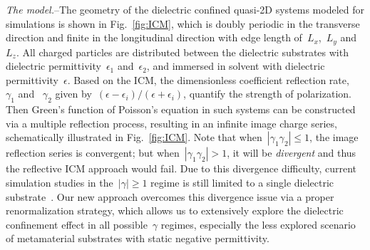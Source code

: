 \documentclass[aps,prl,reprint,showpacs,floatfix,superscriptaddress]{revtex4-2}
\newcommand{\abs}[1]{\left|#1\right|} %
\newcommand{\eps}{\epsilon}
\begin{document}

\textit{The model.}--The geometry of the dielectric confined quasi-2D systems modeled for simulations is shown in Fig.~\ref{fig:ICM}, which is doubly periodic in the transverse direction and finite in the longitudinal direction with edge length of~$L_x$,~$L_y$ and~$L_z$.
All charged particles are distributed between the dielectric substrates with dielectric permittivity~$\eps_1$ and~$\eps_2$, and immersed in solvent with dielectric permittivity~$\eps$.
Based on the ICM, the dimensionless coefficient reflection rate, ~$\gamma_1$ and ~$\gamma_2$ given by~$(\eps - \eps_i)/(\eps + \eps_i)$, quantify the strength of polarization.
Then Green's function of Poisson's equation in such systems can be constructed via a multiple reflection process, resulting in an infinite image charge series, schematically illustrated in Fig.~\ref{fig:ICM}.
Note that when~$\abs{\gamma_1 \gamma_2}\leq 1$, the image reflection series is convergent; but when~$\abs{\gamma_1 \gamma_2}>1$, it will be \emph{divergent} and thus the reflective ICM approach would fail. 
Due to this divergence difficulty, current simulation studies in the~$\abs{\gamma}\geq 1$ regime is still limited to a single dielectric substrate~\cite{wang2019dielectric}.
Our new approach overcomes this divergence issue via a proper renormalization strategy, which allows us to extensively explore the dielectric confinement effect in all possible~$\gamma$ regimes, especially the less explored scenario of metamaterial substrates with static negative permittivity.
\end{document}
